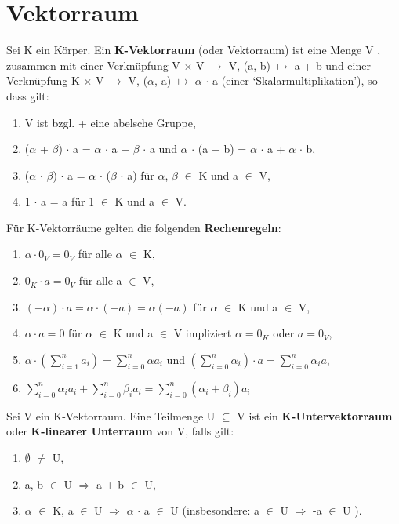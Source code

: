 \section{Vektorraum}
\begin{definition}
Sei K ein Körper. Ein \textbf{K-Vektorraum} (oder Vektorraum) ist eine Menge V , zusammen mit einer Verknüpfung V $\times$ V $\to$ V, (a, b) $\mapsto$ a + b und einer Verknüpfung K $\times$ V $\to$ V, ($\alpha$, a) $\mapsto$ $\alpha$ $\cdot$ a (einer ‘Skalarmultiplikation’), so dass gilt:
\begin{enumerate}
\item V ist bzgl. + eine abelsche Gruppe,
\item ($\alpha$ + $\beta$) $\cdot$ a = $\alpha$ $\cdot$ a + $\beta$ $\cdot$ a und $\alpha$ $\cdot$ (a + b) = $\alpha$ $\cdot$ a + $\alpha$ $\cdot$ b,
\item ($\alpha$ $\cdot$ $\beta$) $\cdot$ a = $\alpha$ $\cdot$ ($\beta$ $\cdot$ a) für $\alpha$, $\beta$ $\in$ K und a $\in$ V,
\item 1 $\cdot$ a = a für 1 $\in$ K und a $\in$ V.
\end{enumerate}
\end{definition}

\begin{remark}
Für K-Vektorräume gelten die folgenden \textbf{Rechenregeln}:
\begin{enumerate}
\item $\alpha \cdot 0_V = 0_V$ für alle $\alpha$ $\in$ K,
\item $0_K \cdot a = 0_V$  für alle a $\in$ V,
\item $(-\alpha) \cdot a = \alpha \cdot (-a) = \alpha(-a)$ für $\alpha$ $\in$ K und a $\in$ V,
\item $\alpha \cdot a = 0$ für $\alpha$ $\in$ K und a $\in$ V impliziert $\alpha = 0_K$ oder $a = 0_V$,
\item $\alpha \cdot (\sum\nolimits_{i=1}^{n} a_i) = \sum\nolimits_{i=0}^{n} \alpha a_i$ und $(\sum\nolimits_{i=0}^{n}\alpha_i) \cdot a = \sum\nolimits_{i=0}^{n} \alpha_i a$,
\item $\sum\nolimits_{i=0}^{n} \alpha_i a_i + \sum\nolimits_{i=0}^{n} \beta_i a_i = \sum\nolimits_{i=0}^{n} (\alpha_i + \beta_i) a_i$
\end{enumerate}
\end{remark}

\begin{definition}
Sei V ein K-Vektorraum. Eine Teilmenge U $\subseteq$ V ist ein \textbf{K-Untervektorraum} oder \textbf{K-linearer Unterraum} von V, falls gilt:
\begin{enumerate}
\item $\emptyset$ $\neq$ U,
\item a, b $\in$ U $\Rightarrow$ a + b $\in$ U,
\item $\alpha$ $\in$ K, a $\in$ U $\Rightarrow$ $\alpha$ $\cdot$ a $\in$ U (insbesondere: a $\in$ U $\Rightarrow$ -a $\in$ U ).
\end{enumerate}
\end{definition}

